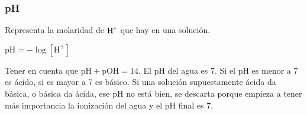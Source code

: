 \subsubsection*{pH}

Representa la molaridad de $\ce{H^+}$ que hay en una solución.

\hfil$\text{pH} = -\log [\text{H}^+]$\hfil

Tener en cuenta que $\text{pH} + \text{pOH} = 14$. El pH del agua es 7. Si el pH es menor a 7 es ácido, si es mayor a 7 es básico. Si una solución supuestamente ácida da básica, o básica da ácida, ese pH no está bien, se descarta porque empieza a tener más importancia la ionización del agua y el pH final es 7.
